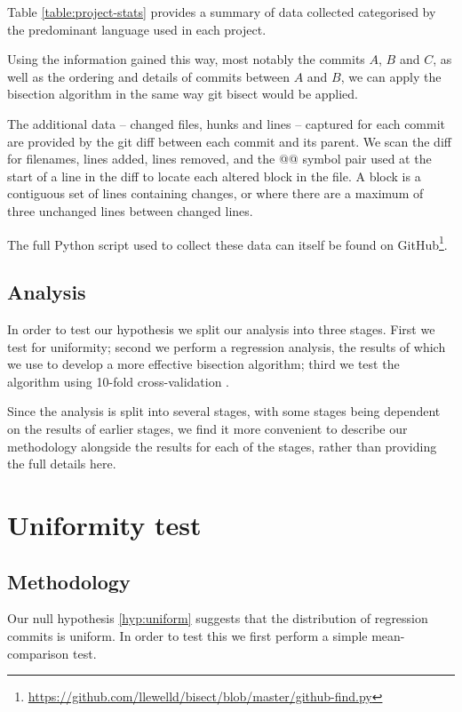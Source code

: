 \documentclass[10pt,journal,compsoc]{IEEEtran}
\begin{document}
Table \ref{table:project-stats} provides a summary of data collected categorised by the predominant language used in each project.

Using the information gained this way, most notably the commits $A$, $B$ and $C$, as well as the ordering and details of commits between $A$ and $B$, we can apply the bisection algorithm in the same way {\code git bisect} would be applied.

The additional data -- changed files, hunks and lines -- captured for each commit are provided by the git diff between each commit and its parent. We scan the diff for filenames, lines added, lines removed, and the {\code @@} symbol pair used at the start of a line in the diff to locate each altered block in the file. A block is a contiguous set of lines containing changes, or where there are a maximum of three unchanged lines between changed lines.

The full Python script used to collect these data can itself be found on GitHub\footnote{\url{https://github.com/llewelld/bisect/blob/master/github-find.py}}.

\subsection{Analysis}

In order to test our hypothesis we split our analysis into three stages. First we test for uniformity; second we perform a regression analysis, the results of which we use to develop a more effective bisection algorithm; third we test the algorithm using 10-fold cross-validation \cite{james2013}.

Since the analysis is split into several stages, with some stages being dependent on the results of earlier stages, we find it more convenient to describe our methodology alongside the results for each of the stages, rather than providing the full details here.

\section{Uniformity test}
\label{section-uniformity}

\subsection{Methodology}

Our null hypothesis \ref{hyp:uniform} suggests that the distribution of regression commits is uniform. In order to test this we first perform a simple mean-comparison test.
\end{document}
